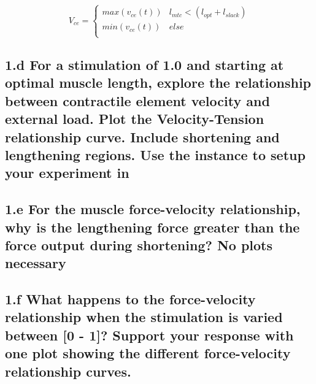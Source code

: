 \documentclass{cmc}
\begin{document}
\begin{equation}
  \label{eq:2}
 V_{ce} = \left\{
\begin{array}{ll}
      max(v_{ce}(t)) & l_{mtc} < (l_{opt} + l_{slack}) \\
      min(v_{ce}(t)) & else \\
\end{array}
\right.
\end{equation}

\subsection*{1.d For a stimulation of 1.0 and starting at optimal
  muscle length, explore the relationship between contractile element
  velocity and external load. Plot the Velocity-Tension relationship
  curve. Include shortening and lengthening regions. Use the
   instance
  to setup your experiment in }

\subsection*{1.e For the muscle force-velocity relationship, why is
  the lengthening force greater than the force output during
  shortening? No plots necessary}


\subsection*{1.f What happens to the force-velocity relationship
  when the stimulation is varied between [0 - 1]? Support your
  response with one plot showing the different force-velocity
  relationship curves.  }
\end{document}
